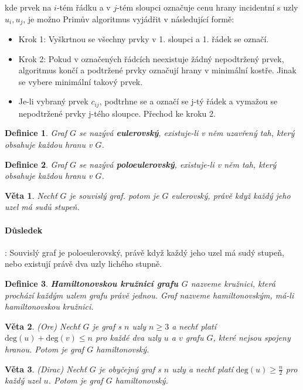 \documentclass[a4paper, 11pt]{report}
\newtheorem{mydef}{Definice}[chapter]
\newtheorem{veta}{Věta}[chapter]
\begin{document}
kde prvek na $i$-tém řádku a v $j$-tém sloupci označuje cenu hrany incidentní s uzly $u_i, u_j$, je možno Primův algoritmus vyjádřit v následující formě:
\begin{itemize}
	\item Krok 1: Vyškrtnou se všechny prvky v 1. sloupci a 1. řádek se označí.
	\item Krok 2: Pokud v označených řádcích neexistuje žádný nepodtržený prvek, algoritmus končí a podtržené prvky označují hrany v minimální kostře. Jinak se vybere minimální takový prvek.
	\item Je-li vybraný prvek $c_{ij}$, podtrhne se a označí se j-tý řádek a vymažou se nepodtržené prvky j-tého sloupce. Přechod ke kroku 2.
\end{itemize}

\begin{mydef}
Graf $G$ se nazývá \textbf{eulerovský}, existuje-li v něm uzavřený tah, který obsahuje každou hranu v $G$.
\end{mydef}

\begin{mydef}
Graf $G$ se nazývá \textbf{poloeulerovský}, existuje-li v něm tah, který obsahuje každou hranu v $G$.
\end{mydef}

\begin{veta}
Nechť $G$ je souvislý graf. potom je $G$ eulerovský, právě když každý jeho uzel má sudů stupeň.
\end{veta}

\paragraph{Důsledek}: Souvislý graf je poloeulerovský, právě když každý jeho uzel má sudý stupeň, nebo existují právě dva uzly lichého stupně.

\begin{mydef}
\textbf{Hamiltonovskou kružnicí grafu $G$} nazveme kružnici, která prochází každým uzlem grafu právě jednou. Graf nazveme hamiltonovským, má-li hamiltonovskou kružnici.
\end{mydef}

\begin{veta}
(Ore) Nechť $G$ je graf s $n$ uzly $n \geq 3$ a nechť platí $\text{deg}(u) + \text{deg}(v) \leq n$ pro každé dva uzly $u$ a $v$ grafu $G$, které nejsou spojeny hranou. Potom je graf $G$ hamiltonovský.
\end{veta}

\begin{veta}
(Dirac) Nechť $G$ je obyčejný graf s $n$ uzly a nechť platí $\text{deg}(u) \geq \frac{n}{2}$ pro každý uzel $u$. Potom je graf $G$ hamiltonovský.
\end{veta}
\end{document}
